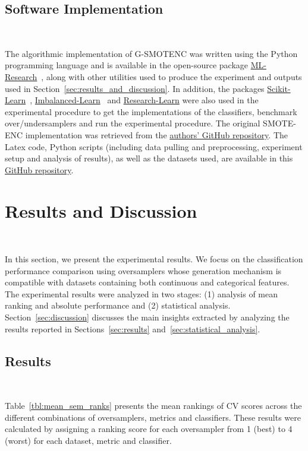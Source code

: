 \documentclass[preprint,12pt]{elsarticle}
\begin{document}
{\subsection{Software Implementation}~\label{sec:software_implementation}

The algorithmic implementation of G-SMOTENC was written using the Python
programming language and is available in the open-source package
\href{https://github.com/joaopfonseca/ml-research}{ML-Research}~\cite{fonseca2021increasing},
along with other utilities used to produce the experiment and outputs used in
Section~\ref{sec:results_and_discussion}. In addition, the packages
\href{https://github.com/scikit-learn/scikit-learn/}{Scikit-Learn}~\cite{scikit-learn},
\href{https://github.com/scikit-learn-contrib/imbalanced-learn}{Imbalanced-Learn}~\cite{JMLR:v18:16-365}
and \href{https://github.com/georgedouzas/research-learn/}{Research-Learn}
were also used in the experimental procedure to get the implementations of the
classifiers, benchmark over/undersamplers and run the experimental procedure.
The original SMOTE-ENC implementation was retrieved from the
\href{https://github.com/Mimimkh/SMOTE-ENC-code}{authors' GitHub repository}.
The Latex code, Python scripts (including data pulling and preprocessing,
experiment setup and analysis of results), as well as the datasets used, are
available in this \href{https://github.com/joaopfonseca/publications}{GitHub
repository}.
 
\section{Results and Discussion}~\label{sec:results_and_discussion}

In this section, we present the experimental results. We focus on the
classification performance comparison using oversamplers whose generation
mechanism is compatible with datasets containing both continuous and
categorical features. The experimental results were analyzed in two stages:
(1) analysis of mean ranking and absolute performance and (2) statistical
analysis. Section~\ref{sec:discussion} discusses the main insights
extracted by analyzing the results reported in Sections~\ref{sec:results}
and~\ref{sec:statistical_analysis}.

\subsection{Results}~\label{sec:results}

Table~\ref{tbl:mean_sem_ranks} presents the mean rankings of CV 
scores across the different combinations of oversamplers, metrics and
classifiers. These results were calculated by assigning a ranking score for
each oversampler from 1 (best) to 4 (worst) for each dataset, metric and
classifier.

}
\end{document}
